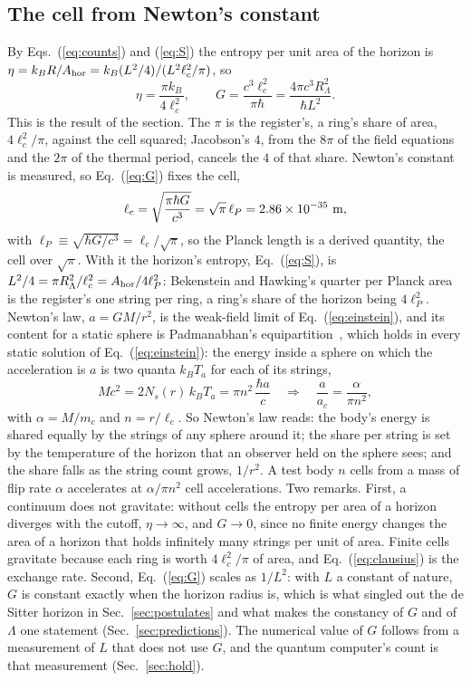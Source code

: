 \documentclass[aps,prd,twocolumn,superscriptaddress,nofootinbib,showkeys]{revtex4-2}
\newcommand{\lc}{\ell_c}
\newcommand{\mc}{m_c}
\newcommand{\ac}{a_c}
\newcommand{\RL}{R_\Lambda}
\begin{document}
\subsection{The cell from Newton's constant}
By Eqs.~(\ref{eq:counts}) and (\ref{eq:S}) the entropy per unit area of the horizon is $\eta = k_B R/A_{\rm hor} = k_B(L^2/4)/(L^2\lc^2/\pi)$, so
\begin{equation}
\eta = \frac{\pi k_B}{4\lc^2}, \qquad
G = \frac{c^3\lc^2}{\pi\hbar} = \frac{4\pi c^3\RL^2}{\hbar L^2} .
\label{eq:G}
\end{equation}
This is the result of the section. The $\pi$ is the register's, a ring's share of area, $4\lc^2/\pi$, against the cell squared; Jacobson's $4$, from the $8\pi$ of the field equations and the $2\pi$ of the thermal period, cancels the $4$ of that share. Newton's constant is measured, so Eq.~(\ref{eq:G}) fixes the cell,
\begin{equation}
\lc = \sqrt{\frac{\pi\hbar G}{c^3}} = \sqrt\pi\,\ell_P = 2.86\times10^{-35}~{\rm m},
\label{eq:cell}
\end{equation}
with $\ell_P \equiv \sqrt{\hbar G/c^3} = \lc/\sqrt\pi$,
so the Planck length is a derived quantity, the cell over $\sqrt\pi$. With it the horizon's entropy, Eq.~(\ref{eq:S}), is $L^2/4 = \pi\RL^2/\lc^2 = A_{\rm hor}/4\ell_P^2$: Bekenstein and Hawking's quarter per Planck area~\cite{bekenstein1973} is the register's one string per ring, a ring's share of the horizon being $4\ell_P^2$. Newton's law, $a = GM/r^2$, is the weak-field limit of Eq.~(\ref{eq:einstein}), and its content for a static sphere is Padmanabhan's equipartition~\cite{padmanabhan2010}, which holds in every static solution of Eq.~(\ref{eq:einstein}): the energy inside a sphere on which the acceleration is $a$ is two quanta $k_BT_a$ for each of its strings,
\begin{equation}
Mc^2 = 2N_s(r)\,k_BT_a = \pi n^2\,\frac{\hbar a}{c}
\quad\Longrightarrow\quad
\frac{a}{\ac} = \frac{\alpha}{\pi n^2} ,
\label{eq:newton}
\end{equation}
with $\alpha = M/\mc$ and $n = r/\lc$. So Newton's law reads: the body's energy is shared equally by the strings of any sphere around it; the share per string is set by the temperature of the horizon that an observer held on the sphere sees; and the share falls as the string count grows, $1/r^2$. A test body $n$ cells from a mass of flip rate $\alpha$ accelerates at $\alpha/\pi n^2$ cell accelerations. Two remarks. First, a continuum does not gravitate: without cells the entropy per area of a horizon diverges with the cutoff, $\eta\to\infty$, and $G\to0$, since no finite energy changes the area of a horizon that holds infinitely many strings per unit of area. Finite cells gravitate because each ring is worth $4\lc^2/\pi$ of area, and Eq.~(\ref{eq:clausius}) is the exchange rate. Second, Eq.~(\ref{eq:G}) scales as $1/L^2$: with $L$ a constant of nature, $G$ is constant exactly when the horizon radius is, which is what singled out the de Sitter horizon in Sec.~\ref{sec:postulates} and what makes the constancy of $G$ and of $\Lambda$ one statement (Sec.~\ref{sec:predictions}). The numerical value of $G$ follows from a measurement of $L$ that does not use $G$, and the quantum computer's count is that measurement (Sec.~\ref{sec:hold}).
\end{document}
